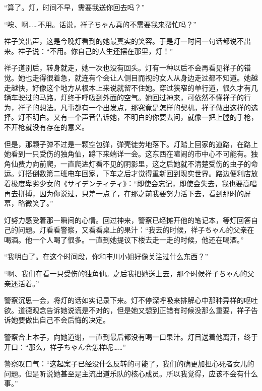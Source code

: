 \documentclass{article}
\begin{document}
“算了。灯，时间不早，需要我送你回去吗？”



“唉、啊……不用。话说，祥子ちゃん真的不需要我来帮忙吗？”



祥子笑出声，这是今晚灯看到的她最真实的笑容。于是灯一时间一句话都说不出来。祥子说：“不用。你自己的人生还摆在那里，灯！”



祥子道别后，转身就走，她一次也没有回头。灯有一种以后不会再看见祥子的错觉。她也走得很着急，就连有个会让人侧目而视的女人从身边走过都不知道。她越走越快，好像这个地方从根本上来说就留不住她。穿过狭窄的单行道，很久才有几辆车驶过的马路，灯终于呼吸到外面的空气。她回过神来，可依然不懂祥子的行为，祥子的想法。凡事都有一个出发点，那究竟是怎样的契机，祥子做出这样的选择。灯不明白。又有一个声音告诉她，不明白的你要去问，就像一把上膛的手枪，不开枪就没有存在的意义。



但是，那颗子弹不过是一颗空包弹，弹壳徒劳地落下。灯踏上回家的道路，在路上她看到一只受伤的独角仙，蹲下来端详一会。这东西在喧闹的市中心不可能有。独角仙费力向前爬，一直爬进灯看不见的阴影里，这之后她就不清楚受伤的虫子的命运。灯搭倒数第二班电车回家，下车之后才觉得重新回到现实世界。路边便利店放着极度卑劣少女的《サイデンティティ》：“即使会忘记，即使会失去，我也要高唱再去拼搏，因为你说过，只差一点了，在那之前我要努力活下去，看到那时的屏幕，略微笑了。”



灯努力感受着那一瞬间的心情。回过神来，警察已经摊开他的笔记本，等灯回答自己的问题。灯看看警察，又看看桌上的果汁：“我去的时候，祥子ちゃん的父亲在喝酒。他一个人喝了很多。一直到她提议下楼去走一走的时候，他还在喝酒。”



“我明白了。在这个时间段，你和丰川小姐好像关注过什么东西？”



“啊、我们在看一只受伤的独角仙。之后我把她送上去，那个时候祥子ちゃん的父亲还活着。”



警察沉思一会，将灯的话如实记录下来。灯不停深呼吸来排解心中那种异样的呕吐欲。道德观念告诉她说谎是不对的，但是她又想到正错有时候没那么重要，祥子告诉她要做出自己不会后悔的决定。



警察合上本子，向她道谢，一直到最后都没有喝一口果汁。灯目送着他离开，终于开口：“那么，祥子ちゃん会怎样呢……”



警察叹口气：“这起案子已经没什么反转的可能了，我们的确更加担心死者女儿的问题。但是听说她甚至是主流出道乐队的核心成员。所以我觉得，应该不会有什么事。”
\end{document}
